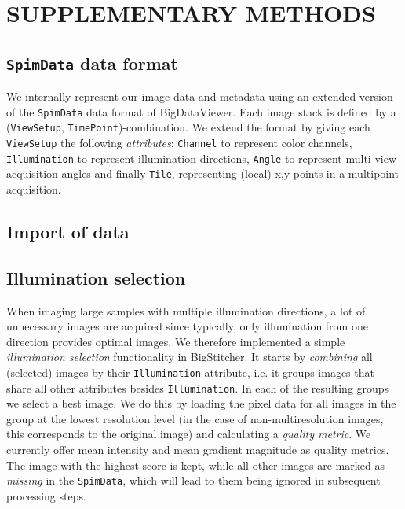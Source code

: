 \section{SUPPLEMENTARY METHODS}
\label{sec:sup-methods}

\subsection{\texttt{SpimData} data format}

We internally represent our image data and metadata using an extended version of the \texttt{SpimData} data format of BigDataViewer\cite{pietzsch2015bigdataviewer}. Each image stack is defined by a (\texttt{ViewSetup}, \texttt{TimePoint})-combination. We extend the format by giving each \texttt{ViewSetup} the following \emph{attributes}: \texttt{Channel} to represent color channels, \texttt{Illumination} to represent illumination directions, \texttt{Angle} to represent multi-view acquisition angles and finally \texttt{Tile}, representing (local) x,y points in a multipoint acquisition.

\subsection{Import of data}

\subsection{Illumination selection}

When imaging large samples with multiple illumination directions,  a lot of unnecessary images are acquired since typically, only illumination from one direction provides optimal images. We therefore implemented a simple \emph{illumination selection} functionality in BigStitcher. It starts by \emph{combining} all (selected) images by their \texttt{Illumination} attribute, i.e. it groups images that share all other attributes besides \texttt{Illumination}. In each of the resulting groups we select a best image. We do this by loading the pixel data for all images in the group at the lowest resolution level (in the case of non-multiresolution images, this corresponds to the original image) and calculating a \emph{quality metric}. We currently offer mean intensity and mean gradient magnitude as quality metrics. The image with the highest score is kept, while all other images are marked as \emph{missing} in the \texttt{SpimData}, which will lead to them being ignored in subsequent processing steps. 


